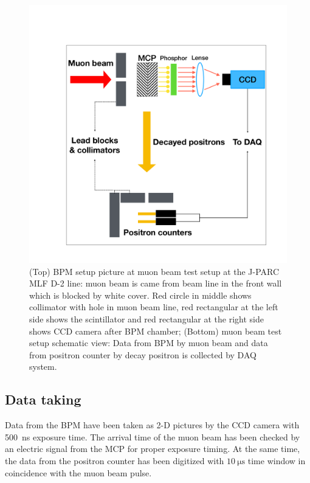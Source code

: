 \documentclass[preprint,3p,twocolumn]{elsarticle}
\begin{document}
\begin{figure}[tb]
{\setlength{\belowdisplayskip}{0pt}
\begin{minipage}[t]{60mm}
\includegraphics[width=1.25\textwidth, height=1.25\textwidth]{figure/BPM_schematic.pdf}
\end{minipage}
}
\caption{{(Top)} BPM setup picture at muon beam test setup at the J-PARC MLF D-2 line: muon beam is came from beam line in the front wall which is blocked by white cover. Red circle in middle shows collimator with hole in muon beam line, red rectangular at the left side shows the scintillator and red rectangular at the right side shows CCD camera after BPM chamber; {(Bottom)} muon beam test setup schematic view: Data from BPM by muon beam and data from positron counter by decay positron is collected by DAQ system.}
\vspace{-0.4cm}
\label{fig:simulation}
\end{figure}
\subsection{Data taking} 
Data from the BPM have been taken as 2-D pictures by the CCD camera with \SI{500}{\nano\s} exposure time.
The arrival time of the muon beam has been checked by an electric signal from the MCP for proper exposure timing. At the same time, the data from the positron counter has been digitized with $\SI{10}{\micro\s}$ time window in coincidence with the muon beam pulse.
\end{document}
